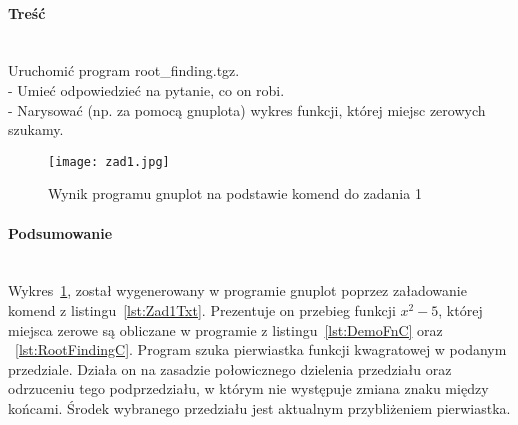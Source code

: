 \paragraph{Treść}~\\
Uruchomić program root\_finding.tgz.\\
- Umieć odpowiedzieć na pytanie, co on robi.\\
- Narysować (np. za pomocą gnuplota) wykres funkcji, której miejsc zerowych szukamy.







\begin{figure}[p]
  \caption{Wynik programu gnuplot na podstawie komend do zadania 1}
  \label{fig:Zad1Jpg}
  \centering
  \texttt{[image: zad1.jpg]}
\end{figure}

\paragraph{Podsumowanie}~\\
Wykres~\ref{fig:Zad1Jpg}, został wygenerowany w programie gnuplot poprzez załadowanie komend z listingu~\ref{lst:Zad1Txt}.
Prezentuje on przebieg funkcji $ x^2 - 5 $, której miejsca zerowe są obliczane w programie z listingu~\ref{lst:DemoFnC} oraz ~\ref{lst:RootFindingC}.
Program szuka pierwiastka funkcji kwagratowej w podanym przedziale.
Działa on na zasadzie połowicznego dzielenia przedziału oraz odrzuceniu tego podprzedziału, w którym nie występuje zmiana znaku między końcami.
Środek wybranego przedziału jest aktualnym przybliżeniem pierwiastka.
